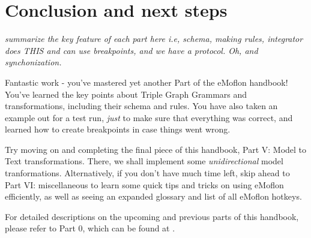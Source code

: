 \section{Conclusion and next steps}
\genHeader

\vspace{0.5cm}

\emph{summarize the key feature of each part here i.e, schema, making rules, integrator does THIS and can use breakpoints, and we have a protocol. Oh, and
synchonization.}

Fantastic work - you've mastered yet another Part of the eMoflon handbook! You've learned the key points about Triple Graph Grammars and transformations,
including their schema and rules. You have also taken an example out for a test run, \emph{just} to make sure that everything was correct, and learned how to
create breakpoints in case things went wrong.

Try moving on and completing the final piece of this handbook, Part V: Model to Text transformations. There, we shall implement some \emph{unidirectional} model
tranformations. Alternatively, if you don't have much time left, skip ahead to Part VI: miscellaneous to learn some quick tips and tricks on using eMoflon
efficiently, as well as seeing an expanded glossary and list of all eMoflon hotkeys.

For detailed descriptions on the upcoming and previous parts of this handbook, please refer to Part 0, which can be found at \dlPartZero.
